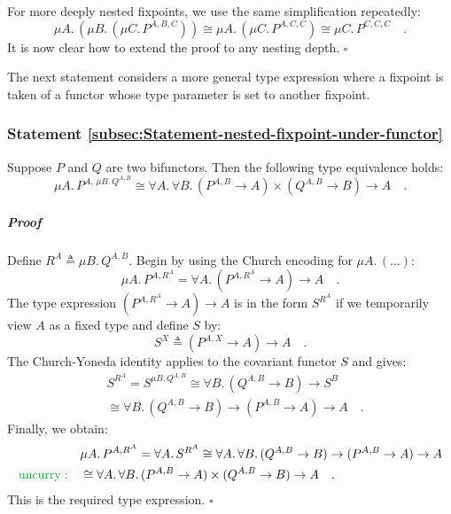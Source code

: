 For more deeply nested fixpoints, we use the same simplification repeatedly:
\[
\mu A.\,(\mu B.\,(\mu C.\,P^{A,B,C}))\cong\mu A.\,(\mu C.\,P^{A,C,C})\cong\mu C.\,P^{C,C,C}\quad.
\]
It is now clear how to extend the proof to any nesting depth. $\square$

The next statement considers a more general type expression where
a fixpoint is taken of a functor whose type parameter is set to another
fixpoint.

\subsubsection{Statement \label{subsec:Statement-nested-fixpoint-under-functor}\ref{subsec:Statement-nested-fixpoint-under-functor}}

Suppose $P$ and $Q$ are two bifunctors. Then the following type
equivalence holds:
\[
\mu A.\,P^{A,\,\mu B.\,Q^{A,B}}\cong\forall A.\,\forall B.\,(P^{A,B}\rightarrow A)\times(Q^{A,B}\rightarrow B)\rightarrow A\quad.
\]


\subparagraph{Proof}

Define $R^{A}\triangleq\mu B.\,Q^{A,B}$. Begin by using the Church
encoding for $\mu A.\,(...)$:
\[
\mu A.\,P^{A,R^{A}}=\forall A.\,(P^{A,R^{A}}\rightarrow A)\rightarrow A\quad.
\]
The type expression $(P^{A,R^{A}}\rightarrow A)\rightarrow A$ is
in the form $S^{R^{A}}$ if we temporarily view $A$ as a fixed type
and define $S$ by:
\[
S^{X}\triangleq(P^{A,X}\rightarrow A)\rightarrow A\quad.
\]
The Church-Yoneda identity applies to the covariant functor $S$ and
gives:
\begin{align*}
 & S^{R^{A}}=S^{\mu B.\,Q^{A,B}}\cong\forall B.\,(Q^{A,B}\rightarrow B)\rightarrow S^{B}\\
 & \cong\forall B.\,(Q^{A,B}\rightarrow B)\rightarrow(P^{A,B}\rightarrow A)\rightarrow A\quad.
\end{align*}
Finally, we obtain:
\begin{align*}
 & \mu A.\,P^{A,R^{A}}=\forall A.\,S^{R^{A}}\cong\forall A.\,\forall B.\,(Q^{A,B}\rightarrow B)\rightarrow(P^{A,B}\rightarrow A)\rightarrow A\\
{\color{greenunder}\text{uncurry}:}\quad & \cong\forall A.\,\forall B.\,(P^{A,B}\rightarrow A)\times(Q^{A,B}\rightarrow B)\rightarrow A\quad.
\end{align*}
This is the required type expression. $\square$


